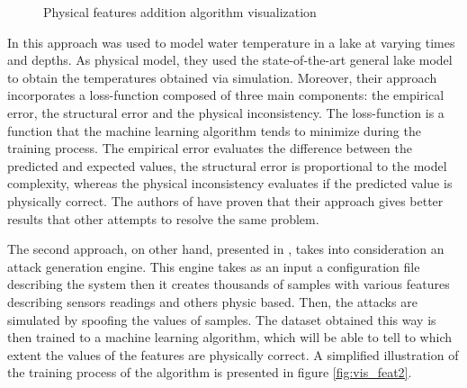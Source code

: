 \begin{figure}[H]
    \centering
    \caption{Physical features addition algorithm visualization} \label{fig:vis_feat1}
\end{figure}

In \cite{karpatne_physics-guided_2018} this approach was used to model water temperature in a lake at varying times and depths. As physical model, they used the state-of-the-art general lake model \cite{hipsey_glm_2014} to obtain the temperatures obtained via simulation. Moreover, their approach incorporates a loss-function composed of three main components: the empirical error, the structural error and the physical inconsistency. The loss-function is a function that the machine learning algorithm tends to minimize during the training process. The empirical error evaluates the difference between the predicted and expected values, the structural error is proportional to the model complexity, whereas the physical inconsistency evaluates if the predicted value is physically correct. The authors of \cite{karpatne_physics-guided_2018} have proven that their approach gives better results that other attempts to resolve the same problem.

The second approach, on other hand, presented in \cite{ferragut_real-time_2017}, takes into consideration an attack generation engine. This engine takes as an input a configuration file describing the system then it creates thousands of samples with various features describing sensors readings and others physic based. Then, the attacks are simulated by spoofing the values of samples. The dataset obtained this way is then trained to a machine learning algorithm, which will be able to tell to which extent the values of the features are physically correct. A simplified illustration of the training process of the algorithm is presented in figure \ref{fig:vis_feat2}.

